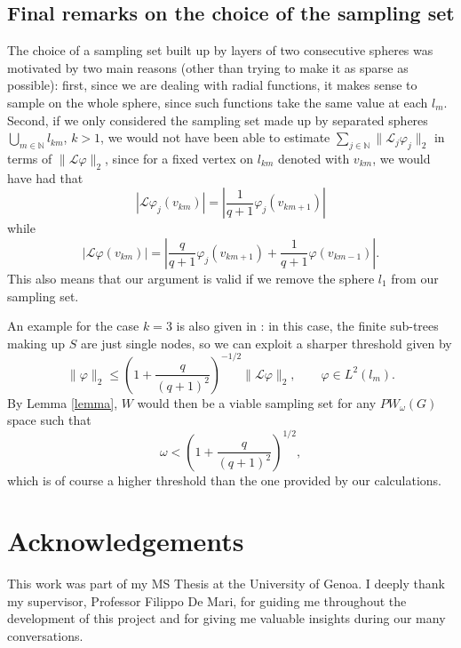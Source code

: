 \documentclass[12pt]{amsart}
\theoremstyle{definition}
\numberwithin{equation}{section}
\theoremstyle{definition}
\theoremstyle{remark}
\numberwithin{equation}{section}
\begin{document}
\subsection{Final remarks on the choice of the sampling set}
The choice of a sampling set built up by layers of two consecutive spheres was motivated by two main reasons (other than trying to make it as sparse as possible): first, since we are dealing with radial functions, it makes sense to sample on the whole sphere, since such functions take the same value at each $l_m$. Second, if we only considered the sampling set made up by separated spheres $\bigcup_{m \in \mathbb{N}}l_{km}$, $k >1$, we would not have been able to estimate $\sum_{j \in \mathbb{N}}\|\mathcal{L}_j\varphi_j\|_2$ in terms of $\|\mathcal{L}\varphi\|_2$, since for a fixed vertex on $l_{km}$ denoted with $v_{km}$, we would have had that 
$$
|\mathcal{L}\varphi_j(v_{km})| = \left|\frac{1}{q+1}\varphi_j(v_{km+1})\right|
$$ 
while 
$$
|\mathcal{L}\varphi(v_{km})|=\left|\frac{q}{q+1}\varphi_j(v_{km+1}) + \frac{1}{q+1}\varphi(v_{km-1})\right|.
$$ 
This also means that our argument is valid if we remove the sphere $l_1$ from our sampling set. 

An example for the case $k =3$ is also given in \cite{PW1}: in this case, the finite sub-trees making up $S$ are just single nodes, so we can exploit a sharper threshold given by
$$
\|\varphi\|_2 \leq \left(1 + \frac{q}{(q+1)^2}\right)^{-1/2}\|\mathcal{L}\varphi\|_2, \qquad \varphi \in L^2(l_m).
$$
By Lemma \ref{lemma}, $W$ would then be a viable sampling set for any $PW_\omega(G)$ space such that $$\omega < \left(1 + \frac{q}{(q+1)^2}\right)^{1/2},$$ which is of course a higher threshold than the one provided by our calculations. 
\section*{Acknowledgements}
This work was part of my MS Thesis at the University of Genoa. I deeply thank my supervisor, Professor Filippo De Mari, for guiding me throughout the development of this project and for giving me valuable insights during our many conversations. 
\end{document}
